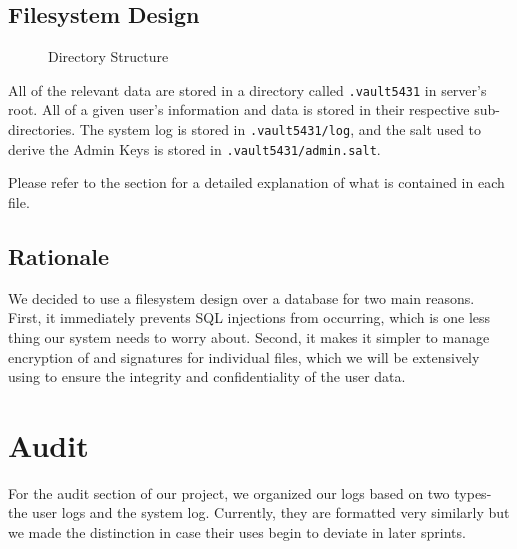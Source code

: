 \documentclass{article}
\begin{document}
\subsection{Filesystem Design}
\label{sub:filesystem_design}

\begin{figure}[h!]
  \centering
  \begin{subfigure}[b]{0.3\textwidth}
  \end{subfigure}
  \caption{Directory Structure}
  \label{fig:directory_structure}
\end{figure}

\par All of the relevant data are stored in a directory called \texttt{.vault5431} in server's root. All of a given user's information and data is stored in their respective sub-directories. The system log is stored in \texttt{.vault5431/log}, and the salt used to derive the Admin Keys is stored in \texttt{.vault5431/admin.salt}.
\par Please refer to the  section for a detailed explanation of what is contained in each file.

\subsection{Rationale}
\par We decided to use a filesystem design over a database for two main reasons. First, it immediately prevents SQL injections from occurring, which is one less thing our system needs to worry about. Second, it makes it simpler to manage encryption of and signatures for individual files, which we will be extensively using to ensure the integrity and confidentiality of the user data.

\section{Audit}
For the audit section of our project, we organized our logs based on two types- the user logs and the system log. Currently, they are formatted very similarly but we made the distinction in case their uses begin to deviate in later sprints.
\end{document}
